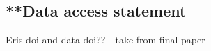 \documentclass[11pt, twoside]{report}
\begin{document}
\subsection{**Data access statement}
Eris doi and data doi?? - take from final paper






\end{document}
